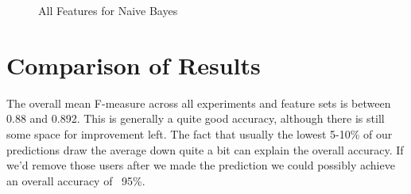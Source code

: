 \begin{figure}[H]
	\caption{All Features for Naive Bayes}
\end{figure}


\section{Comparison of Results}

The overall mean F-measure across all experiments and feature sets is between 0.88 and 0.892. This is generally a quite good accuracy, although there is still some space for improvement left. The fact that usually the lowest 5-10\% of our predictions draw the average down quite a bit can explain the overall accuracy. If we'd remove those users after we made the prediction we could possibly achieve an overall accuracy of ~95\%.

